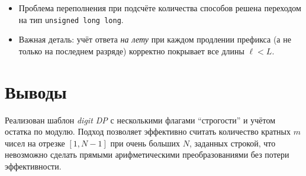 \documentclass[12pt,a4paper]{article}
\begin{document}
\begin{itemize}
  \item Проблема переполнения при подсчёте количества способов решена переходом на тип \texttt{unsigned long long}.
  \item Важная деталь: учёт ответа \emph{на лету} при каждом продлении префикса (а не только на последнем разряде) корректно покрывает все длины $\ell<L$.
\end{itemize}

\section*{Выводы}

Реализован шаблон \emph{digit DP} с несколькими флагами ``строгости'' и учётом остатка по модулю.
Подход позволяет эффективно считать количество кратных $m$ чисел на отрезке $[1,N-1]$ при очень больших $N$, заданных строкой, что невозможно сделать прямыми арифметическими преобразованиями без потери эффективности.
\end{document}

